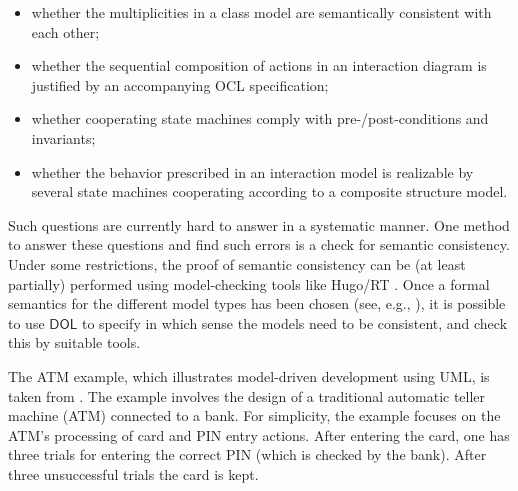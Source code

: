 \documentclass[10pt, a4paper]{isov2}
\newcommand*{\DOL}{\ensuremath{\mathsf{DOL}}\xspace}
\begin{document}
\begin{itemize}
\item whether the multiplicities in a class model are semantically consistent with each other;
\item	  whether the sequential composition of actions in an interaction diagram is justified by an accompanying OCL specification;
\item 	whether cooperating state machines comply with pre-/post-conditions and invariants;
\item 	whether the behavior prescribed in an interaction model is realizable by several state machines cooperating according to a composite structure model.
\end{itemize}
Such questions are currently hard to answer in a systematic manner. One method to answer these questions and find such errors is a check for semantic
consistency. Under some restrictions, the proof of semantic consistency can be (at least partially) performed using model-checking tools like Hugo/RT \cite{knapp-wuttke:models06wsh:2007}.
Once a formal semantics for the different model types has been chosen (see, e.g., \cite{knapp-mossakowski-roggenbach:corr:2014}), it is possible to use \DOL to specify in which
sense the models need to be consistent, and check this by suitable tools.


\label{sec:atm-example}

 The ATM example, which illustrates model-driven development using UML,
is taken from \cite{knapp-mossakowski-roggenbach:corr:2014}.  The example involves
the design of a traditional automatic teller machine (ATM) connected
to a bank. For simplicity,  the example focuses
 on the ATM's processing of card and PIN entry actions.
After entering the card, one has three
trials for entering the correct PIN (which is checked by the
bank). After three unsuccessful trials the card is kept.
\end{document}

